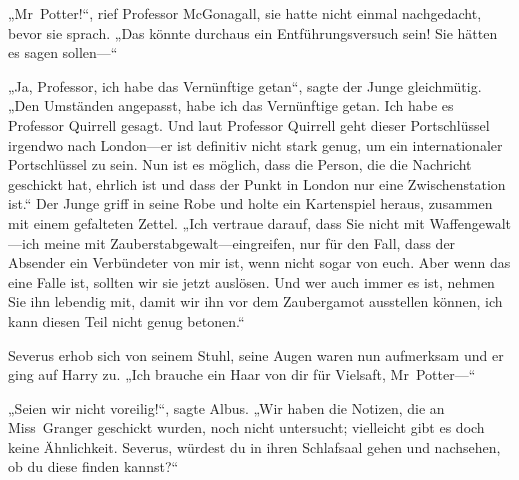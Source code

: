 „Mr~Potter!“, rief Professor McGonagall, sie hatte nicht einmal nachgedacht, bevor sie sprach. „Das könnte durchaus ein Entführungsversuch sein! Sie hätten es sagen sollen—“

„Ja, Professor, ich habe das Vernünftige getan“, sagte der Junge gleichmütig. „Den Umständen angepasst, habe ich das Vernünftige getan. Ich habe es Professor Quirrell gesagt. Und laut Professor Quirrell geht dieser Portschlüssel irgendwo nach London—er ist definitiv nicht stark genug, um ein internationaler Portschlüssel zu sein. Nun ist es möglich, dass die Person, die die Nachricht geschickt hat, ehrlich ist und dass der Punkt in London nur eine Zwischenstation ist.“
Der Junge griff in seine Robe und holte ein Kartenspiel heraus, zusammen mit einem gefalteten Zettel.
„Ich vertraue darauf, dass Sie nicht mit Waffengewalt—ich meine mit Zauberstabgewalt—eingreifen, nur für den Fall, dass der Absender ein Verbündeter von mir ist, wenn nicht sogar von euch. Aber wenn das eine Falle ist, sollten wir sie jetzt auslösen. Und wer auch immer es ist, nehmen Sie ihn lebendig mit, damit wir ihn vor dem Zaubergamot ausstellen können, ich kann diesen Teil nicht genug betonen.“

Severus erhob sich von seinem Stuhl, seine Augen waren nun aufmerksam und er ging auf Harry zu. „Ich brauche ein Haar von dir für Vielsaft, Mr~Potter—“

„Seien wir nicht voreilig!“, sagte Albus. „Wir haben die Notizen, die an Miss~Granger geschickt wurden, noch nicht untersucht; vielleicht gibt es doch keine Ähnlichkeit. Severus, würdest du in ihren Schlafsaal gehen und nachsehen, ob du diese finden kannst?“

